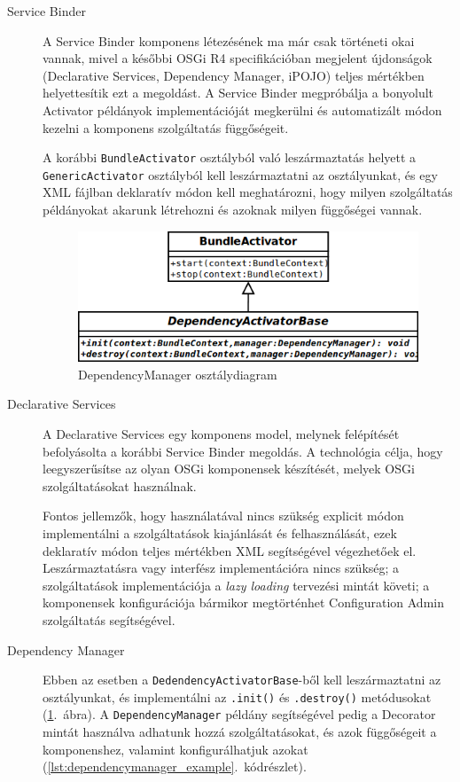 \begin{description}
	\item[Service Binder] A Service Binder komponens létezésének ma már csak történeti okai vannak, mivel a későbbi OSGi R4 specifikációban megjelent újdonságok (Declarative Services, Dependency Manager, iPOJO) teljes mértékben helyettesítik ezt a megoldást. A Service Binder megpróbálja a bonyolult Activator példányok implementációját megkerülni és automatizált módon kezelni a komponens szolgáltatás függőségeit.
	
	A korábbi \texttt{BundleActivator} osztályból való leszármaztatás helyett a \texttt{GenericActivator} osztályból kell leszármaztatni az osztályunkat, és egy XML fájlban deklaratív módon kell meghatározni, hogy milyen szolgáltatás példányokat akarunk létrehozni és azoknak milyen függőségei vannak.
	
\begin{figure}[htp]
\centering
\includegraphics[scale=0.6]{img/class_dependencymanager}
\caption{DependencyManager osztálydiagram}
\label{fig:class_dependencymanager}
\end{figure}

	\item[Declarative Services] A Declarative Services egy komponens model, melynek felépítését befolyásolta a korábbi Service Binder megoldás. A technológia célja, hogy leegyszerűsítse az olyan OSGi komponensek készítését, melyek OSGi szolgáltatásokat használnak.
	
	Fontos jellemzők, hogy használatával nincs szükség explicit módon implementálni a szolgáltatások kiajánlását és felhasználását, ezek deklaratív módon teljes mértékben XML segítségével végezhetőek el. Leszármaztatásra vagy interfész implementációra nincs szükség; a szolgáltatások implementációja a \textit{lazy loading} tervezési mintát követi; a komponensek konfigurációja bármikor megtörténhet Configuration Admin szolgáltatás segítségével.
	
	\item[Dependency Manager] Ebben az esetben a \texttt{DedendencyActivatorBase}-ből kell leszármaztatni az osztályunkat, és implementálni az \texttt{.init()} és \texttt{.destroy()} metódusokat (\ref{fig:class_dependencymanager}.~ábra). A \texttt{DependencyManager} példány segítségével pedig a Decorator mintát használva adhatunk hozzá szolgáltatásokat, és azok függőségeit a komponenshez, valamint konfigurálhatjuk azokat (\ref{lst:dependencymanager_example}.~kódrészlet).


\end{description}
